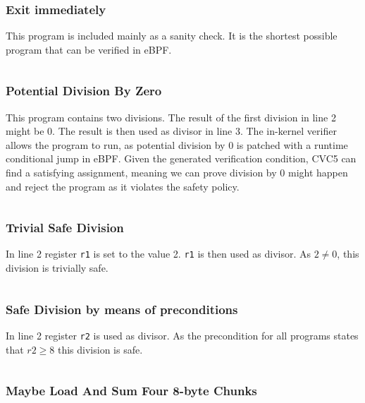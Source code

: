 \subsubsection{Exit immediately}
\label{prog:justexit}
This program is included mainly as a sanity check. It is the shortest possible program that can be verified in eBPF.

\inputminted[linenos]{asm}{programs/justexit.asm}

\subsubsection{Potential Division By Zero}
\label{prog:bad_div}

This program contains two divisions. The result of the first division in line 2 might be 0. The result is then used as divisor in line 3.
The in-kernel verifier allows the program to run, as potential division by 0 is patched with a runtime conditional jump in eBPF. Given the generated verification condition, CVC5 can find a satisfying assignment, meaning we can prove division by 0 might happen and reject the program as it violates the safety policy. 
\inputminted[linenos]{asm}{programs/bad_div.asm}


\subsubsection{Trivial Safe Division}
\label{prog:good_div}

In line 2 register \texttt{r1} is set to the value 2. \texttt{r1} is then used as divisor. As $2 \neq 0$, this division is trivially safe.

\inputminted[linenos]{asm}{programs/good_div.asm}

\subsubsection{Safe Division by means of preconditions}
\label{prog:good_div_pre}

In line 2 register \texttt{r2} is used as divisor. As the precondition for all programs states that $r2 \geq 8$ this division is safe.

\inputminted[linenos]{asm}{programs/good_div_pre.asm}


\subsubsection{Maybe Load And Sum Four 8-byte Chunks}
\label{prog:load4times_safe}

